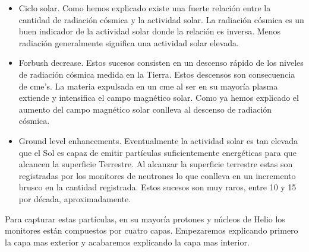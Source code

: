 	\begin{itemize}
	  	\item	Ciclo solar. Como hemos explicado existe una fuerte relación entre la cantidad de radiación cósmica y la actividad solar. 
		  	La radiación cósmica es un buen indicador de la actividad solar donde la relación es inversa. Menos radiación generalmente
			significa una actividad solar elevada.	
		\item	Forbush decrease. Estos sucesos consisten en un descenso rápido de los niveles de radiación cósmica medida en la Tierra. Estos
		  	descensos son consecuencia de \gls{cme}'s. La materia expulsada en un \gls{cme} al ser en su mayoría plasma extiende y intensifica el 	
			campo magnético solar. Como ya hemos explicado el aumento del campo magnético solar conlleva al descenso de radiación cósmica. 
		\item	Ground level enhancements. Eventualmente la actividad solar es tan elevada que el Sol es capaz de emitir partículas
		  	suficientemente energéticas para que alcancen la superficie Terrestre. Al alcanzar la superficie terrestre estas son 
			registradas por los monitores de neutrones lo que conlleva en un incremento brusco en la cantidad registrada. Estos sucesos
			son muy raros, entre 10 y 15 por década, aproximadamente.  
	\end{itemize}
	Para capturar estas partículas, en su mayoría protones y núcleos de Helio los monitores están compuestos por cuatro capas. Empezaremos 
	explicando primero la capa mas exterior y acabaremos explicando la capa mas interior.
